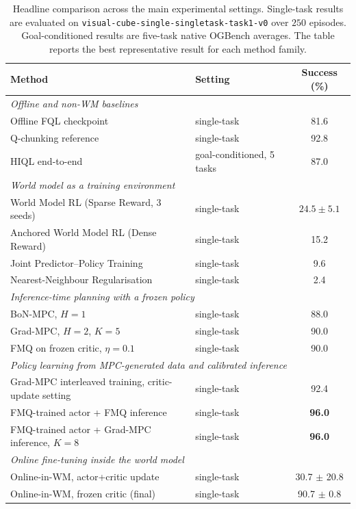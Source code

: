 \begin{table}[h]
\centering
\caption{Headline comparison across the main experimental settings.
Single-task results are evaluated on
\texttt{visual-cube-single-singletask-task1-v0} over $250$ episodes.
Goal-conditioned results are five-task native OGBench averages. The
table reports the best representative result for each method family.}
\label{tab:headline}
\begin{tabular}{llc}
\toprule
Method & Setting & Success (\%) \\
\midrule
\multicolumn{3}{l}{\emph{Offline and non-WM baselines}} \\
Offline FQL checkpoint & single-task & 81.6 \\
Q-chunking reference & single-task & 92.8 \\
HIQL end-to-end & goal-conditioned, 5 tasks & 87.0 \\
\midrule
\multicolumn{3}{l}{\emph{World model as a training environment}} \\
World Model RL (Sparse Reward, 3 seeds) & single-task & $24.5 \pm 5.1$ \\
Anchored World Model RL (Dense Reward) & single-task & 15.2 \\
Joint Predictor--Policy Training & single-task & 9.6 \\
Nearest-Neighbour Regularisation & single-task & 2.4 \\
\midrule
\multicolumn{3}{l}{\emph{Inference-time planning with a frozen policy}} \\
BoN-MPC, $H=1$ & single-task & 88.0 \\
Grad-MPC, $H=2$, $K=5$ & single-task & 90.0 \\
FMQ on frozen critic, $\eta=0.1$ & single-task & 90.0 \\
\midrule
\multicolumn{3}{l}{\emph{Policy learning from MPC-generated data and calibrated inference}} \\
Grad-MPC interleaved training, critic-update setting & single-task & 92.4 \\
FMQ-trained actor + FMQ inference & single-task & \textbf{96.0} \\
FMQ-trained actor + Grad-MPC inference, $K=8$ & single-task & \textbf{96.0} \\
\midrule
\multicolumn{3}{l}{\emph{Online fine-tuning inside the world model}} \\
Online-in-WM, actor+critic update & single-task & 30.7 $\pm$ 20.8 \\
Online-in-WM, frozen critic (final) & single-task & 90.7 $\pm$ 0.8 \\

\end{tabular}
\end{table}
